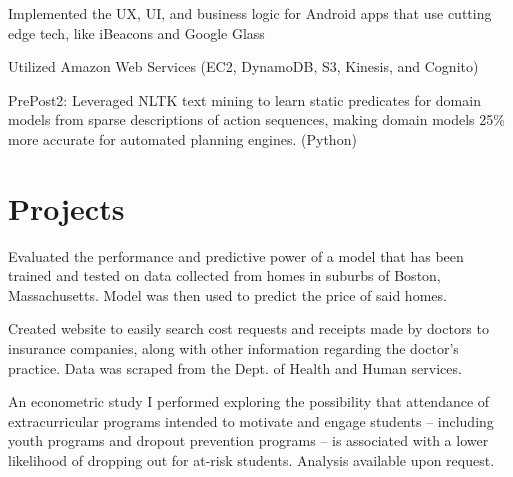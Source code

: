 \documentclass[]{deedy-resume-openfont}
\begin{document}
\begin{minipage}[t]{0.66\textwidth}
\begin{tightemize}
\item Implemented the UX, UI, and business logic for Android apps that use cutting edge tech, like iBeacons and Google Glass

\item Utilized Amazon Web Services (EC2, DynamoDB, S3, Kinesis, and Cognito)
\end{tightemize}
\sectionsep

\begin{tightemize}
\item PrePost2: Leveraged NLTK text mining to learn static predicates for domain models from sparse descriptions of action sequences, making domain models 25\% more accurate for automated planning engines. (Python)
\end{tightemize}
\sectionsep



\section{Projects}

\begin{tightemize}
\item Evaluated the performance and predictive power of a model that has been trained and tested on data collected from homes in suburbs of Boston, Massachusetts. Model was then used to predict the price of said homes.
\end{tightemize}
\sectionsep

\begin{tightemize}
\item Created website to easily search cost requests and receipts made by doctors to insurance companies, along with other information regarding the doctor's practice. Data was scraped from the Dept. of Health and Human services.
\end{tightemize}
\sectionsep

\begin{tightemize}
\item An econometric study I performed exploring the possibility that attendance of extracurricular programs intended to motivate and engage students – including youth programs and dropout prevention programs – is associated with a lower likelihood of dropping out for at-risk students. Analysis available upon request.
\end{tightemize}
\sectionsep


\end{minipage} 
\end{document}

